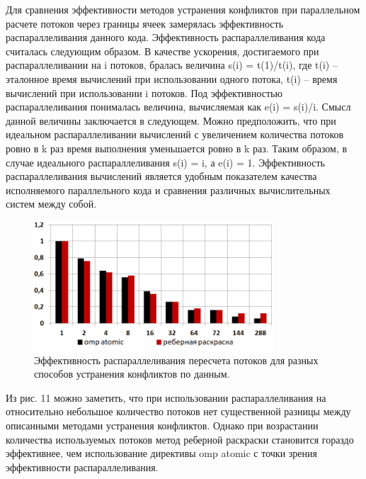 Для сравнения эффективности методов устранения конфликтов при параллельном расчете потоков через границы ячеек замерялась эффективность распараллеливания данного кода.
Эффективность распараллеливания кода считалась следующим образом. В качестве ускорения, достигаемого при распараллеливании на i потоков, бралась величина s(i) = t(1)/t(i), где t(i) – эталонное время вычислений при использовании одного потока, t(i) – время вычислений при использовании i потоков.
Под эффективностью распараллеливания понималась величина, вычисляемая как e(i) = s(i)/i. Смысл данной величины заключается в следующем. Можно предположить, что при идеальном распараллеливании вычислений с увеличением количества потоков ровно в k раз время выполнения уменьшается ровно в k раз.
Таким образом, в случае идеального распараллеливания s(i) = i, а e(i) = 1. Эффективность распараллеливания вычислений является удобным показателем качества исполняемого параллельного кода и сравнения различных вычислительных систем между собой.

\begin{figure}[ht]
\centering
\includegraphics[width=0.8\textwidth]{./pics/text_3_edge_coloring/11-chart.png}
\singlespacing
{}\caption{Эффективность распараллеливания пересчета потоков для разных способов устранения конфликтов по данным.}
\label{fig:text_3_edge_coloring_11}
\end{figure}

Из рис. 11 можно заметить, что при использовании распараллеливания на относительно небольшое количество потоков нет существенной разницы между описанными методами устранения конфликтов.
Однако при возрастании количества используемых потоков метод реберной раскраски становится гораздо эффективнее, чем использование директивы omp atomic с точки зрения эффективности распараллеливания.

